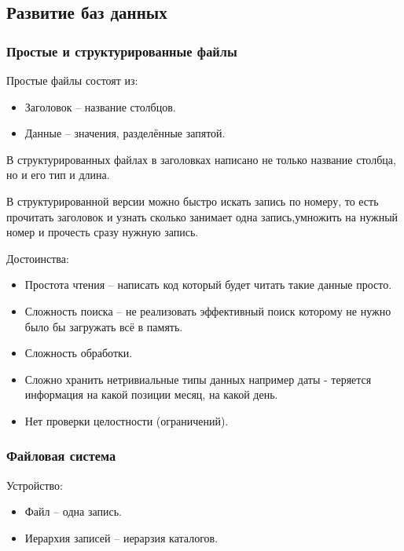 \subsection{Развитие баз данных}
\subsubsection{Простые и структурированные файлы}

Простые файлы состоят из:
\begin{itemize}
	\item Заголовок -- название столбцов.
	\item Данные -- значения, разделённые запятой.
\end{itemize}
В структурированных файлах в заголовках написано не только название столбца, но и его тип и длина.

\begin{remark}
	В структурированной версии можно быстро искать запись по номеру, то есть прочитать заголовок и
	узнать сколько занимает одна запись,умножить на нужный номер и прочесть сразу нужную запись.
\end{remark}

Достоинства:
\begin{itemize}
	\item Простота чтения -- написать код который будет читать такие данные просто.
\end{itemize}

\begin{itemize}
	\item Сложность поиска -- не реализовать эффективный поиск которому не нужно было бы загружать всё в
	      память.
	\item Сложность обработки.
	\item Сложно хранить нетривиальные типы данных например даты - теряется информация на какой позиции
	      месяц, на какой день.
	\item Нет проверки целостности	(ограничений).
\end{itemize}

\subsubsection{Файловая система}

Устройство:
\begin{itemize}
	\item Файл -- одна запись.
	\item Иерархия записей -- иерарзия каталогов.
\end{itemize}

